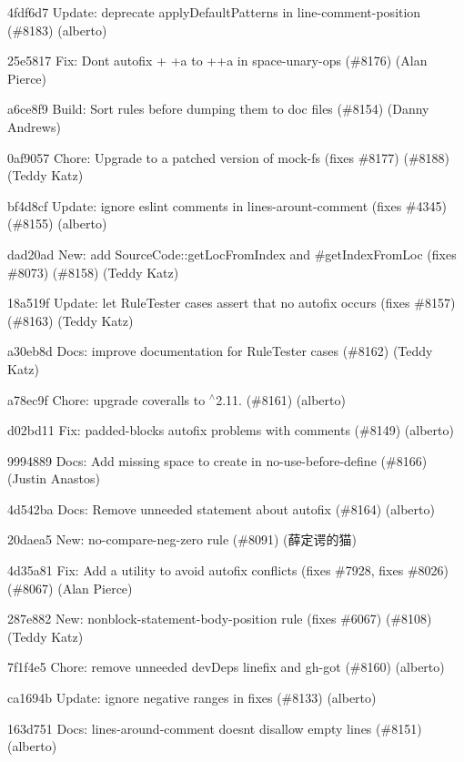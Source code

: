 \begin{DoxyItemize}
\item 4fdf6d7 Update\+: deprecate {\ttfamily apply\+Default\+Patterns} in {\ttfamily line-\/comment-\/position} (\#8183) (alberto)
\item 25e5817 Fix\+: Don\textquotesingle{}t autofix {\ttfamily + +a} to {\ttfamily ++a} in space-\/unary-\/ops (\#8176) (Alan Pierce)
\item a6ce8f9 Build\+: Sort rules before dumping them to doc files (\#8154) (Danny Andrews)
\item 0af9057 Chore\+: Upgrade to a patched version of mock-\/fs (fixes \#8177) (\#8188) (Teddy Katz)
\item bf4d8cf Update\+: ignore eslint comments in lines-\/arount-\/comment (fixes \#4345) (\#8155) (alberto)
\item dad20ad New\+: add Source\+Code\+::get\+Loc\+From\+Index and \#get\+Index\+From\+Loc (fixes \#8073) (\#8158) (Teddy Katz)
\item 18a519f Update\+: let Rule\+Tester cases assert that no autofix occurs (fixes \#8157) (\#8163) (Teddy Katz)
\item a30eb8d Docs\+: improve documentation for Rule\+Tester cases (\#8162) (Teddy Katz)
\item a78ec9f Chore\+: upgrade {\ttfamily coveralls} to \texorpdfstring{$^\wedge$}{\string^}2.11. (\#8161) (alberto)
\item d02bd11 Fix\+: padded-\/blocks autofix problems with comments (\#8149) (alberto)
\item 9994889 Docs\+: Add missing space to {\ttfamily create} in {\ttfamily no-\/use-\/before-\/define} (\#8166) (Justin Anastos)
\item 4d542ba Docs\+: Remove unneeded statement about autofix (\#8164) (alberto)
\item 20daea5 New\+: no-\/compare-\/neg-\/zero rule (\#8091) (薛定谔的猫)
\item 4d35a81 Fix\+: Add a utility to avoid autofix conflicts (fixes \#7928, fixes \#8026) (\#8067) (Alan Pierce)
\item 287e882 New\+: nonblock-\/statement-\/body-\/position rule (fixes \#6067) (\#8108) (Teddy Katz)
\item 7f1f4e5 Chore\+: remove unneeded dev\+Deps {\ttfamily linefix} and {\ttfamily gh-\/got} (\#8160) (alberto)
\item ca1694b Update\+: ignore negative ranges in fixes (\#8133) (alberto)
\item 163d751 Docs\+: {\ttfamily lines-\/around-\/comment} doesn\textquotesingle{}t disallow empty lines (\#8151) (alberto)

\end{DoxyItemize}
